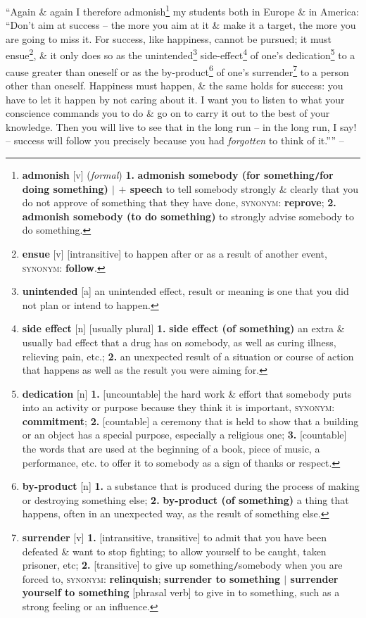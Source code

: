 \documentclass[oneside]{book}
\numberwithin{equation}{section}
\begin{document}
\begin{enumerate}[leftmargin=0mm]
	``Again \& again I therefore admonish\footnote{\textbf{admonish} [v] (\textit{formal}) \textbf{1.} \textbf{admonish somebody (for something\texttt{/}for doing something) $|$ $+$ speech} to tell somebody strongly \& clearly that you do not approve of something that they have done, \textsc{synonym}: \textbf{reprove}; \textbf{2.} \textbf{admonish somebody (to do something)} to strongly advise somebody to do something.} my students both in Europe \& in America: ``Don't aim at success -- the more you aim at it \& make it a target, the more you are going to miss it. For success, like happiness, cannot be pursued; it must ensue\footnote{\textbf{ensue} [v] [intransitive] to happen after or as a result of another event, \textsc{synonym}: \textbf{follow}.}, \& it only does so as the unintended\footnote{\textbf{unintended} [a] an unintended effect, result or meaning is one that you did not plan or intend to happen.} side-effect\footnote{\textbf{side effect} [n] [usually plural] \textbf{1.} \textbf{side effect (of something)} an extra \& usually bad effect that a drug has on somebody, as well as curing illness, relieving pain, etc.; \textbf{2.} an unexpected result of a situation or course of action that happens as well as the result you were aiming for.} of one's dedication\footnote{\textbf{dedication} [n] \textbf{1.} [uncountable] the hard work \& effort that somebody puts into an activity or purpose because they think it is important, \textsc{synonym}: \textbf{commitment}; \textbf{2.} [countable] a ceremony that is held to show that a building or an object has a special purpose, especially a religious one; \textbf{3.} [countable] the words that are used at the beginning of a book, piece of music, a performance, etc. to offer it to somebody as a sign of thanks or respect.} to a cause greater than oneself or as the by-product\footnote{\textbf{by-product} [n] \textbf{1.} a substance that is produced during the process of making or destroying something else; \textbf{2.} \textbf{by-product (of something)} a thing that happens, often in an unexpected way, as the result of something else.} of one's surrender\footnote{\textbf{surrender} [v] \textbf{1.} [intransitive, transitive] to admit that you have been defeated \& want to stop fighting; to allow yourself to be caught, taken prisoner, etc; \textbf{2.} [transitive] to give up something\texttt{/}somebody when you are forced to, \textsc{synonym}: \textbf{relinquish}; \textbf{surrender to something $|$ surrender yourself to something} [phrasal verb] to give in to something, such as a strong feeling or an influence.} to a person other than oneself. Happiness must happen, \& the same holds for success: you have to let it happen by not caring about it. I want you to listen to what your conscience commands you to do \& go on to carry it out to the best of your knowledge. Then you will live to see that in the long run -- in the long run, I say! -- success will follow you precisely because you had \textit{forgotten} to think of it.'''' -- \cite[Preface to the 1992 Edition, p. 12]{Frankl2013}

\end{enumerate}
\end{document}
